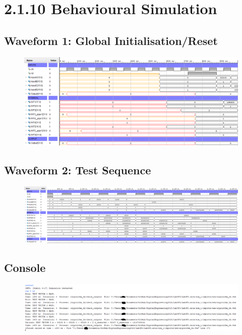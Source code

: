 \documentclass[11pt]{report}
\begin{document}
\section*{2.1.10 Behavioural Simulation}

\subsection*{Waveform 1: Global Initialisation/Reset}
\begin{figure}[H]
    \includegraphics[width=\columnwidth]{Assets/2.1.10_waveform-initial-reset.png}
\end{figure}

\subsection*{Waveform 2: Test Sequence}
\begin{figure}[H]
    \includegraphics[width=\columnwidth]{Assets/2.1.10_waveform-test-sequence.png}
\end{figure}

\subsection*{Console}
\begin{figure}[H]
    \includegraphics[width=\columnwidth]{Assets/2.1.10_console.png}
\end{figure}
\end{document}
